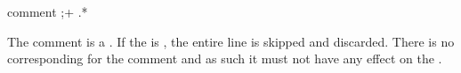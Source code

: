 \begin{identifier}{comment}
;+ .*
\end{identifier} 

The comment is a . If the   is , the entire line is skipped and discarded. There is no corresponding  for the comment  and as such it must not have any effect on the . \\

